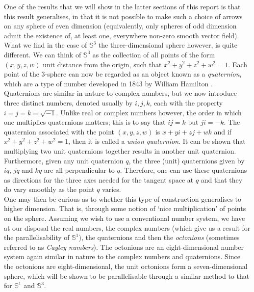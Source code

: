 One of the results that we will show in the latter sections of this report is that this result generalises, in that it is not possible to make such a choice of arrows on any sphere of even dimension (equivalently, only spheres of odd dimension admit the existence of, at least one, everywhere non-zero smooth vector field). 
What we find in the case of $\mathbb{S}^3$ the three-dimensional sphere however, is quite different. We can think of $\mathbb{S}^3$ as the collection of all points of the form $(x,y,z,w)$ unit distance from the origin, such that $x^2+y^2+z^2+w^2=1$. Each point of the 3-sphere can now be regarded as an object known as a \textit{quaternion}, which are a type of number developed in 1843 by William Hamilton \cite{hamilton1844ii}.\\

Quaternions are similar in nature to complex numbers, but we now introduce three distinct numbers, denoted usually by $i,j,k$, each with the property $i=j=k=\sqrt{-1}$. Unlike real or complex numbers however, the order in which one multiplies quaternions matters; this is to say that $ij=k$ but $ji=-k$. The quaternion associated with the point $(x,y,z,w)$ is $x+yi+zj+wk$ and if $x^2+y^2+z^2+w^2=1$, then it is called a \textit{union quaternion}.
It can be shown that multiplying two unit quaternions together results in another unit quaternion. Furthermore, given any unit quaternion $q$, the three (unit) quaternions given by $iq$, $jq$ and $kq$ are all perpendicular to $q$. Therefore, one can use these quaternions as directions for the three axes needed for the tangent space at $q$ and that they do vary smoothly as the point $q$ varies.\\

One may then be curious as to whether this type of construction generalises to higher dimension. That is, through some notion of `nice multiplication' of points on the sphere. Assuming we wish to use a conventional number system, we have at our disposal the real numbers, the complex numbers (which give us a result for the parallelisability of $\mathbb{S}^1$), the quaternions and then the \textit{octonions} (sometimes referred to as \textit{Cayley numbers}). The octonions are an eight-dimensional number system again similar in nature to the complex numbers and quaternions. Since the octonions are eight-dimensional, the unit octonions form a seven-dimensional sphere, which will be shown to be parallelisable through a similar method to that for $\mathbb{S}^1$ and $\mathbb{S}^3$.\\
 
